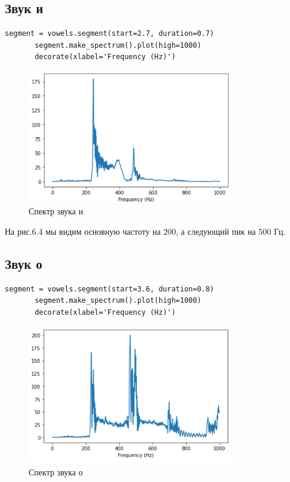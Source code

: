\documentclass[a4paper,12pt]{report}
\begin{document}
\subsection{Звук и}
\begin{lstlisting}[caption=Получение спектра звука и]
       segment = vowels.segment(start=2.7, duration=0.7)
       segment.make_spectrum().plot(high=1000)
       decorate(xlabel='Frequency (Hz)')
\end{lstlisting}
\begin{figure}[H]
        \centering
        \includegraphics[width=0.8\textwidth]{fig6-4.PNG}
        \caption{Спектр звука и}
        \label{fig:fig6-4}
\end{figure}

    На рис.6.4 мы видим основную частоту на 200, а следующий пик на 500 Гц.

\subsection{Звук о}
\begin{lstlisting}[caption=Получение спектра звука о]
       segment = vowels.segment(start=3.6, duration=0.8)
       segment.make_spectrum().plot(high=1000)
       decorate(xlabel='Frequency (Hz)')
\end{lstlisting}
\begin{figure}[H]
        \centering
        \includegraphics[width=0.8\textwidth]{fig6-5.PNG}
        \caption{Спектр звука о}
        \label{fig:fig6-5}
\end{figure}
\end{document}
